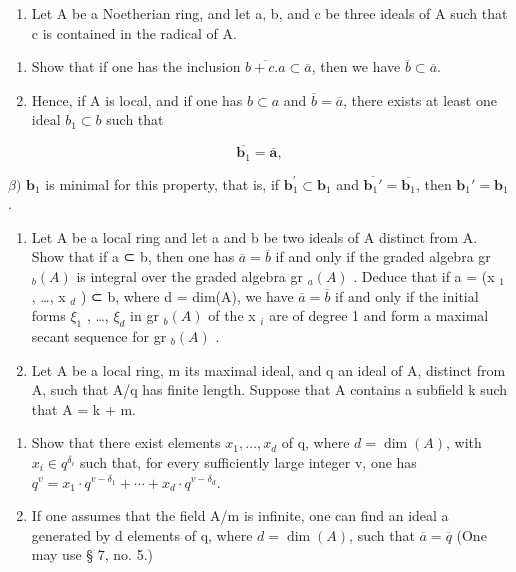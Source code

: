 \begin{enumerate}
\def\labelenumi{\arabic{enumi})}
\setcounter{enumi}{11}
\tightlist
\item
  Let A be a Noetherian ring, and let a, b, and c be three ideals of A such that c is contained in the radical of A.
\end{enumerate}

\begin{enumerate}
\def\labelenumi{\alph{enumi})}
\item
  Show that if one has the inclusion \(\overline{b + c.a} \subset \overline{a}\), then we have \(\overline{b} \subset \overline{a}\).
\item
  Hence, if A is local, and if one has \(b \subset a\) and \(\overline{b} = \overline{a}\), there exists at least one ideal \(b_{1} \subset b\) such that
\end{enumerate}

\[
\overline {{{\mathbf {b} _ {1}}}} = \overline {{{\mathbf {a}}}},
\]

\(\beta)\) \(\mathbf{b}_{1}\) is minimal for this property, that is, if \(\mathbf{b}_{1}^{\prime}\subset \mathbf{b}_{1}\) and \(\overline{\mathbf{b}_1'} = \overline{\mathbf{b}_1}\), then \(\mathbf{b}_1' = \mathbf{b}_1\).

\begin{enumerate}
\def\labelenumi{\arabic{enumi})}
\setcounter{enumi}{12}
\item
  Let A be a local ring and let a and b be two ideals of A distinct from A. Show that if a ⊂ b, then one has \(\overline{a} = \overline{b}\) if and only if the graded algebra gr \(_b(A)\) is integral over the graded algebra gr \(_a(A)\) . Deduce that if a = (x \(_1\) , \ldots, x \(_d\) ) ⊂ b, where d = dim(A), we have \(\overline{a} = \overline{b}\) if and only if the initial forms \(\xi_{1}\) , \ldots, \(\xi_{d}\) in gr \(_b(A)\) of the x \(_i\) are of degree 1 and form a maximal secant sequence for gr \(_b(A)\) .
\item
  Let A be a local ring, m its maximal ideal, and q an ideal of A, distinct from A, such that A/q has finite length. Suppose that A contains a subfield k such that A = k + m.
\end{enumerate}

\begin{enumerate}
\def\labelenumi{\alph{enumi})}
\tightlist
\item
  Show that there exist elements \(x_{1}, \ldots, x_{d}\) of q, where \(d = \dim(A)\), with \(x_{i} \in q^{\delta_{i}}\) such that, for every sufficiently large integer v, one has \(q^{v} = x_{1} \cdot q^{v - \delta_{1}} + \cdots + x_{d} \cdot q^{v - \delta_{d}}\).
\item
  If one assumes that the field A/m is infinite, one can find an ideal a generated by d elements of q, where \(d = \dim(A)\), such that \(\overline{a} = \overline{q}\) (One may use § 7, no. 5.)
\end{enumerate}

